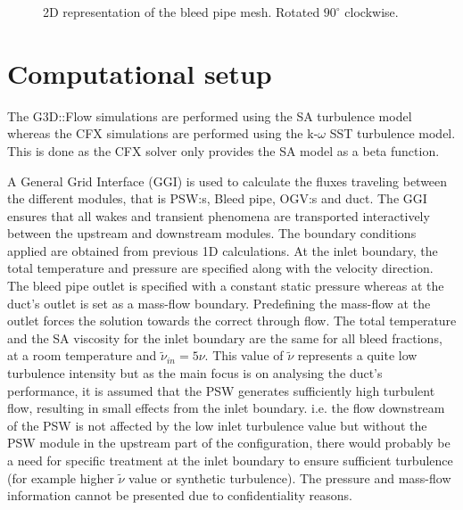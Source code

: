 \begin{figure}[h!]
  \centering
\caption{2D representation of the bleed pipe mesh. Rotated $90^\circ$ clockwise.}\label{fig:bleed}
\end{figure}


\section{Computational setup}
The G3D::Flow simulations are performed using the SA turbulence model whereas the CFX simulations are performed using the k-$\omega$ SST turbulence model. This is done as the CFX solver only provides the SA model as a beta function.

A General Grid Interface (GGI) is used to calculate the fluxes traveling between the different modules, that is PSW:s, Bleed pipe, OGV:s and duct. The GGI ensures that all wakes and transient phenomena are transported interactively between the upstream and downstream modules. The boundary conditions applied are obtained from previous 1D calculations. At the inlet boundary, the total temperature and pressure are specified along with the velocity direction. The bleed pipe outlet is specified with a constant static pressure whereas at the duct's outlet is set as a mass-flow boundary. Predefining the mass-flow at the outlet forces the solution towards the correct through flow. The total temperature and the SA viscosity for the inlet boundary are the same for all bleed fractions, at a room temperature and $\tilde{\nu}_{in}=5\nu$. This value of $\tilde{\nu}$ represents a quite low turbulence intensity but as the main focus is on analysing the duct’s performance, it is assumed that the PSW generates sufficiently high turbulent flow, resulting in small effects from the inlet boundary. i.e. the flow downstream of the PSW is not affected by the low inlet turbulence value but without the PSW module in the upstream part of the configuration, there would probably be a need for specific treatment at the inlet boundary to ensure sufficient turbulence (for example higher $\tilde{\nu}$ value or synthetic turbulence). The pressure and mass-flow information cannot be presented due to confidentiality reasons.

